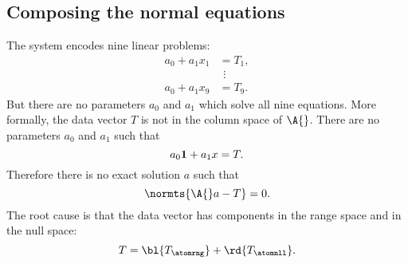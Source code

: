 \subsection{Composing the normal equations}  %
The system encodes nine linear problems:
  \begin{equation*}   %
   \begin{split}
    a_{0} + a_{1} x_{1} & = T_{1}, \\
     & \ \, \vdots \\
    a_{0} + a_{1} x_{9} & = T_{9}.
    \end{split}
  \end{equation*}
But there are no parameters $a_{0}$ and $a_{1}$ which solve all nine equations. More formally, the data vector $T$ is not in the column space of $\A{}$. There are no parameters $a_{0}$ and $a_{1}$ such that
  \begin{equation*}   %
    a_{0} {\bf{1}} + a_{1} x = T.
  \end{equation*}
Therefore there is no exact solution $a$ such that
  \begin{equation*}   %
      \normts{\A{}a - T} = 0 .
  \end{equation*}
The root cause is that the data vector has components in the range space and in the null space:
  \begin{equation*}   %
      T = {\bl{T_{\atomrng}}} + {\rd{T_{\atomnll}}}.
  \end{equation*}


